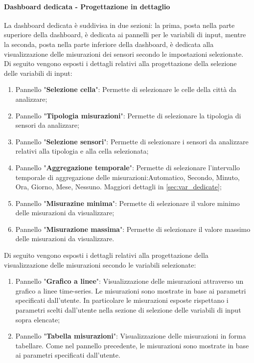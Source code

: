 \paragraph*{Dashboard dedicata - Progettazione in dettaglio}
La dashboard dedicata è suddivisa in due sezioni: la prima, posta nella parte superiore della dashboard, è dedicata ai pannelli per le variabili di input, mentre la seconda, posta nella parte inferiore della dashboard, è dedicata alla visualizzazione delle misurazioni dei sensori secondo le impostazioni selezionate.\\
Di seguito vengono esposti i dettagli relativi alla progettazione della selezione delle variabili di input:
\begin{enumerate}
    \item Pannello "\textbf{Selezione cella}": Permette di selezionare le celle della città da analizzare;
    \item Pannello "\textbf{Tipologia misurazioni}": Permette di selezionare la tipologia di sensori da analizzare;
    \item Pannello "\textbf{Selezione sensori}": Permette di selezionare i sensori da analizzare relativi alla tipologia e alla cella selezionata;
    \item Pannello "\textbf{Aggregazione temporale}": Permette di selezionare l'intervallo temporale di aggregazione delle misurazioni:{Automatico, Secondo, Minuto, Ora, Giorno, Mese, Nessuno}. Maggiori dettagli in \ref{sec:var_dedicate};
    \item Pannello "\textbf{Misurazine minima}": Permette di selezionare il valore minimo delle misurazioni da visualizzare;
    \item Pannello "\textbf{Misurazione massima}": Permette di selezionare il valore massimo delle misurazioni da visualizzare.
\end{enumerate}
Di seguito vengono esposti i dettagli relativi alla progettazione della visualizzazione delle misurazioni secondo le variabili selezionate:
\begin{enumerate}
    \item Pannello "\textbf{Grafico a linee}": Visualizzazione delle misurazioni attraverso un grafico a linee time-series. Le misurazioni sono mostrate in base ai parametri specificati dall’utente. In particolare le misurazioni esposte rispettano i parametri scelti dall'utente nella sezione di selezione delle variabili di input sopra elencate;
    \item Pannello "\textbf{Tabella misurazioni}": Visualizzazione delle misurazioni in forma tabellare. Come nel pannello precedente, le misurazioni sono mostrate in base ai parametri specificati dall'utente.
\end{enumerate}


